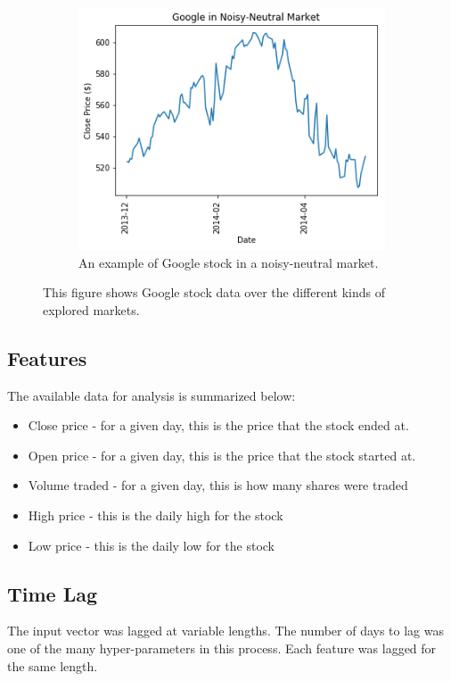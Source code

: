 \documentclass[12pt]{article}
\begin{document}
\begin{figure}[t!]
\begin{subfigure}[t]{0.3\textwidth}
		\centering
		\includegraphics[width=\linewidth]{googNoisy.png}
		\caption{An example of Google stock in a noisy-neutral market.}
	\end{subfigure}
	
	\caption{This figure shows Google stock data over the different kinds of explored markets.}
\end{figure}

\subsection{Features}
The available data for analysis is summarized below:

\begin{itemize}
	\item Close price - for a given day, this is the price that the stock ended at.
	\item Open price - for a given day, this is the price that the stock started at.
	\item Volume traded - for a given day, this is how many shares were traded
	\item High price - this is the daily high for the stock
	\item Low price - this is the daily low for the stock
\end{itemize}

\subsection{Time Lag}
The input vector was lagged at variable lengths. The number of days to lag was one of the many hyper-parameters in this process. Each feature was lagged for the same length.
\end{document}
